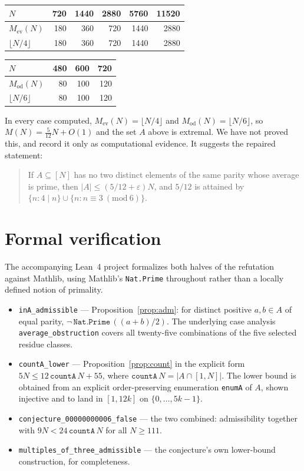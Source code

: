 \documentclass[11pt]{article}
\theoremstyle{plain}
\theoremstyle{definition}
\theoremstyle{remark}
\begin{document}
\begin{center}
\begin{tabular}{lrrrrr}
\toprule
$N$ & 720 & 1440 & 2880 & 5760 & 11520\\
\midrule
$M_{\mathrm{ev}}(N)$ & 180 & 360 & 720 & 1440 & 2880\\
$\lfloor N/4\rfloor$ & 180 & 360 & 720 & 1440 & 2880\\
\bottomrule
\end{tabular}
\qquad
\begin{tabular}{lrrr}
\toprule
$N$ & 480 & 600 & 720\\
\midrule
$M_{\mathrm{od}}(N)$ & 80 & 100 & 120\\
$\lfloor N/6\rfloor$ & 80 & 100 & 120\\
\bottomrule
\end{tabular}
\end{center}

In every case computed, $M_{\mathrm{ev}}(N)=\lfloor N/4\rfloor$ and
$M_{\mathrm{od}}(N)=\lfloor N/6\rfloor$, so $M(N)=\tfrac5{12}N+O(1)$ and the
set $A$ above is extremal. We have not proved this, and record it only as
computational evidence. It suggests the repaired statement:

\begin{quote}
If $A\subseteq[N]$ has no two distinct elements of the same parity whose
average is prime, then $|A|\le(5/12+\varepsilon)N$, and $5/12$ is attained by
$\{n:4\mid n\}\cup\{n:n\equiv3\ (\mathrm{mod}\ 6)\}$.
\end{quote}

\section{Formal verification}

The accompanying Lean~4 project formalizes both halves of the refutation
against Mathlib, using Mathlib's \texttt{Nat.Prime} throughout rather than a
locally defined notion of primality.

\begin{itemize}
  \item \texttt{inA\_admissible} --- Proposition~\ref{prop:adm}: for distinct
    positive $a,b\in A$ of equal parity, $\lnot\,\texttt{Nat.Prime}\,((a+b)/2)$.
    The underlying case analysis \texttt{average\_obstruction} covers all
    twenty-five combinations of the five selected residue classes.
  \item \texttt{countA\_lower} --- Proposition~\ref{prop:count} in the explicit
    form $5N\le 12\,\texttt{countA}\,N+55$, where
    $\texttt{countA}\,N=|A\cap[1,N]|$. The lower bound is obtained from an
    explicit order-preserving enumeration \texttt{enumA} of $A$, shown
    injective and to land in $[1,12k]$ on $\{0,\ldots,5k-1\}$.
  \item \texttt{conjecture\_00000000006\_false} --- the two combined:
    admissibility together with $9N<24\,\texttt{countA}\,N$ for all $N\ge111$.
  \item \texttt{multiples\_of\_three\_admissible} --- the conjecture's own
    lower-bound construction, for completeness.
\end{itemize}
\end{document}
